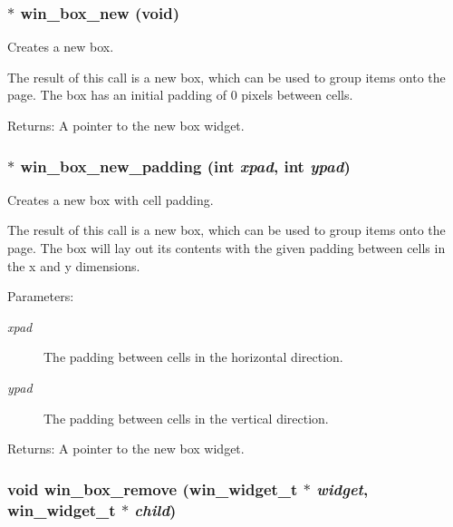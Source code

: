 \subsubsection{$\ast$ win\_\-box\_\-new (void)}\label{winbox_8h_a4}


Creates a new box. 

The result of this call is a new box, which can be used to group items onto the page. The box has an initial padding of 0 pixels between cells.

\begin{Desc}
\item[Returns:]A pointer to the new box widget. \end{Desc}
\subsubsection{$\ast$ win\_\-box\_\-new\_\-padding (int {\em xpad}, int {\em ypad})}\label{winbox_8h_a5}


Creates a new box with cell padding. 

The result of this call is a new box, which can be used to group items onto the page. The box will lay out its contents with the given padding between cells in the x and y dimensions.

\begin{Desc}
\item[Parameters:]
\begin{description}
\item[{\em xpad}]The padding between cells in the horizontal direction. \item[{\em ypad}]The padding between cells in the vertical direction.\end{description}
\end{Desc}
\begin{Desc}
\item[Returns:]A pointer to the new box widget. \end{Desc}
\subsubsection{\setlength{\rightskip}{0pt plus 5cm}void win\_\-box\_\-remove ({\bf win\_\-widget\_\-t} $\ast$ {\em widget}, {\bf win\_\-widget\_\-t} $\ast$ {\em child})}\label{winbox_8h_a9}


